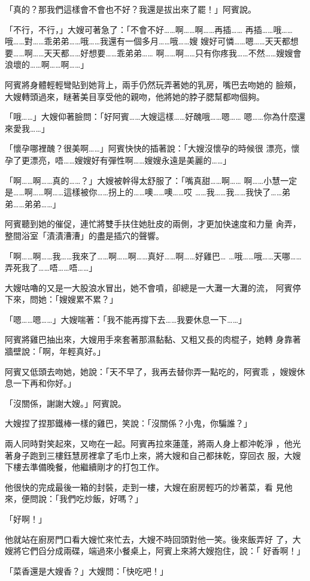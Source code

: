 「真的？那我們這樣會不會也不好？我還是拔出來了罷！」阿賓說。

「不行，不行，」大嫂可著急了：「不會不好……啊……啊……再插……
再插……哦……哦……對……乖弟弟……哦……我還有一個多月……哦……嫂
嫂好可憐……嗯……天天都想要……啊……天天都……好想要……乖弟弟……
啊……啊……只有你疼我……不然……嫂嫂會浪壞的……啊……啊……」

阿賓將身體輕輕彎貼到她背上，兩手仍然玩弄著她的乳房，嘴巴去吻她的
臉頰，大嫂轉頭過來，瞇著美目享受他的親吻，他將她的脖子腮幫都吻個夠。

「哦……」大嫂仰著臉問：「好阿賓……大嫂這樣……好醜哦……嗯……
嗯……你為什麼還來愛我……」

「懷孕哪裡醜？很美啊……」阿賓快快的插著說：「大嫂沒懷孕的時候很
漂亮，懷孕了更漂亮，唔……嫂嫂好有彈性啊……嫂嫂永遠是美麗的……」

「啊……啊……真的……？」大嫂被幹得太舒服了：「嘴真甜……啊……
啊……小慧一定是……啊……啊……這樣被你……拐上的……噢……噢……哎
……我……我……我快了……弟弟……弟弟……」

阿賓聽到她的催促，連忙將雙手扶住她肚皮的兩側，才更加快速度和力量
肏弄，整間浴室「漬漬漕漕」的盡是插穴的聲響。

「啊……啊……我……我來了……啊……啊……真好……啊……好雞巴…
…哦……哦……天哪……弄死我了……唔……唔……」

大嫂咕嚕的又是一大股浪水冒出，她不會噴，卻總是一大灘一大灘的流，
阿賓停下來，問她：「嫂嫂累不累？」

「嗯……嗯……」大嫂喘著：「我不能再撐下去……我要休息一下……」

阿賓將雞巴抽出來，大嫂用手來套著那濕黏黏、又粗又長的肉棍子，她轉
身靠著牆壁說：「啊，年輕真好。」

阿賓又低頭去吻她，她說：「天不早了，我再去替你弄一點吃的，阿賓乖
，嫂嫂休息一下再和你好。」

「沒關係，謝謝大嫂。」阿賓說。

大嫂捏了捏那鐵棒一樣的雞巴，笑說：「沒關係？小鬼，你騙誰？」

兩人同時對笑起來，又吻在一起。阿賓再拉來蓮蓬，將兩人身上都沖乾淨
，他光著身子跑到三樓鈺慧房裡拿了毛巾上來，將大嫂和自己都抹乾，穿回衣
服，大嫂下樓去準備晚餐，他繼續剛才的打包工作。

他很快的完成最後一箱的封裝，走到一樓，大嫂在廚房輕巧的炒著菜，看
見他來，便問說：「我們吃炒飯，好嗎？」

「好啊！」

他就站在廚房門口看大嫂忙來忙去，大嫂不時回頭對他一笑。後來飯弄好
了，大嫂將它們舀分成兩碟，端過來小餐桌上，阿賓上來將大嫂抱住，說：「
好香啊！」

「菜香還是大嫂香？」大嫂問：「快吃吧！」

